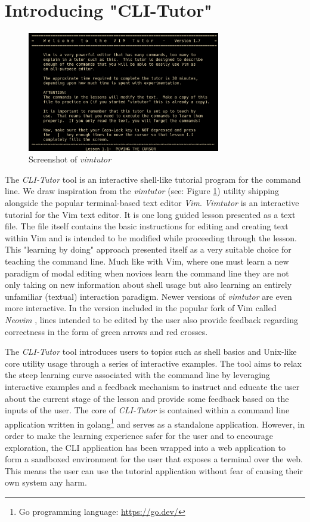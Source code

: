 \section{Introducing "CLI-Tutor"}
\begin{figure}[htbp]
	\centering
	\includegraphics[width=0.75\textwidth]{img/vimtutor}
	\caption{Screenshot of \textit{vimtutor}}
	\label{fig:vimtutor}
\end{figure}

The \textit{CLI-Tutor} tool is an interactive shell-like tutorial program for
the command line. We draw inspiration from the
\textit{vimtutor}\cite{pierce_ware_smith_moolenaar_2019} (see: Figure
\ref{fig:vimtutor}) utility shipping alongside the popular terminal-based text
editor \textit{Vim}. \textit{Vimtutor} is an interactive tutorial for the Vim text
editor. It is one long guided lesson presented as a text file. The file itself
contains the basic instructions for editing and creating text within Vim and is
intended to be modified while proceeding through the lesson. This "learning by
doing" approach presented itself as a very suitable choice for teaching the
command line. Much like with Vim, where one must learn a new paradigm of modal
editing when novices learn the command line they are not only taking on new
information about shell usage but also learning an entirely unfamiliar
(textual) interaction paradigm. Newer versions of \textit{vimtutor} are even more
interactive. In the version included in the popular fork of Vim called \textit{Neovim}
\cite{neovimHomeNeovim}, lines intended to be edited by the user also provide
feedback regarding correctness in the form of green arrows and red crosses.

The \textit{CLI-Tutor} tool introduces users to topics such as shell basics and
Unix-like core utility usage through a series of interactive examples. The tool
aims to relax the steep learning curve associated with the command line by
leveraging interactive examples and a feedback mechanism to instruct and
educate the user about the current stage of the lesson and provide some
feedback based on the inputs of the user. The core of \textit{CLI-Tutor} is
contained within a command line application written in golang\footnote{Go
	programming language: \href{https://go.dev/}{https://go.dev/}} and serves as a
standalone application. However, in order to make the learning experience safer
for the user and to encourage exploration, the CLI application has been wrapped
into a web application to form a sandboxed environment for the user that
exposes a terminal over the web. This means the user can use the tutorial
application without fear of causing their own system any harm.

